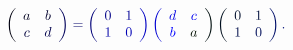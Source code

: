 \documentclass[12pt]{article}
\begin{document}
\makeatletter
\renewcommand*{\@textcolor}[3]{%
  \protect\leavevmode
  \begingroup
    \color#1{#2}#3%
  \endgroup
}
\makeatother
\begin{displaymath}
\mathcolor[RGB]{0,0,15}{\left(} \begin{array} {cc} { \mathcolor[RGB]{0,0,30}{a} } & { \mathcolor[RGB]{0,0,45}{b} } \\ { \mathcolor[RGB]{0,0,60}{c} } & { \mathcolor[RGB]{0,0,75}{d} } \end{array} \mathcolor[RGB]{0,0,90}{\right)} \mathcolor[RGB]{0,0,105}{=} \mathcolor[RGB]{0,0,120}{\left(} \begin{array} {cc} { \mathcolor[RGB]{0,0,135}{0} } & { \mathcolor[RGB]{0,0,150}{1} } \\ { \mathcolor[RGB]{0,0,165}{1} } & { \mathcolor[RGB]{0,0,180}{0} } \end{array} \mathcolor[RGB]{0,0,195}{\right)} \mathcolor[RGB]{0,0,210}{\left(} \begin{array} {cc} { \mathcolor[RGB]{0,0,225}{d} } & { \mathcolor[RGB]{0,0,240}{c} } \\ { \mathcolor[RGB]{0,0,255}{b} } & { \mathcolor[RGB]{0,15,0}{a} } \end{array} \mathcolor[RGB]{0,15,15}{\right)} \mathcolor[RGB]{0,15,30}{\left(} \begin{array} {cc} { \mathcolor[RGB]{0,15,45}{0} } & { \mathcolor[RGB]{0,15,60}{1} } \\ { \mathcolor[RGB]{0,15,75}{1} } & { \mathcolor[RGB]{0,15,90}{0} } \end{array} \mathcolor[RGB]{0,15,105}{\right)} \mathcolor[RGB]{0,15,120}{.}
\end{displaymath}
\end{document}
